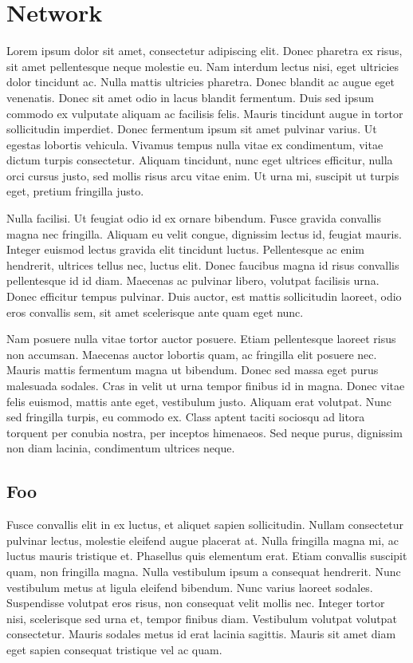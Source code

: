 \chapter{Network}

Lorem ipsum dolor sit amet, consectetur adipiscing
elit. Donec pharetra ex risus, sit amet pellentesque
neque molestie eu. Nam interdum lectus nisi, eget
ultricies dolor tincidunt ac. Nulla mattis ultricies
pharetra. Donec blandit ac augue eget venenatis.
Donec sit amet odio in lacus blandit fermentum. Duis
sed ipsum commodo ex vulputate aliquam ac facilisis
felis. Mauris tincidunt augue in tortor sollicitudin
imperdiet. Donec fermentum ipsum sit amet pulvinar
varius. Ut egestas lobortis vehicula. Vivamus tempus
nulla vitae ex condimentum, vitae dictum turpis
consectetur. Aliquam tincidunt, nunc eget ultrices
efficitur, nulla orci cursus justo, sed mollis risus
arcu vitae enim. Ut urna mi, suscipit ut turpis
eget, pretium fringilla justo.

Nulla facilisi. Ut feugiat odio id ex ornare
bibendum. Fusce gravida convallis magna nec
fringilla. Aliquam eu velit congue, dignissim lectus
id, feugiat mauris. Integer euismod lectus gravida
elit tincidunt luctus. Pellentesque ac enim
hendrerit, ultrices tellus nec, luctus elit. Donec
faucibus magna id risus convallis pellentesque id id
diam. Maecenas ac pulvinar libero, volutpat
facilisis urna. Donec efficitur tempus pulvinar.
Duis auctor, est mattis sollicitudin laoreet, odio
eros convallis sem, sit amet scelerisque ante quam
eget nunc.

Nam posuere nulla vitae tortor auctor posuere. Etiam
pellentesque laoreet risus non accumsan. Maecenas
auctor lobortis quam, ac fringilla elit posuere nec.
Mauris mattis fermentum magna ut bibendum. Donec sed
massa eget purus malesuada sodales. Cras in velit ut
urna tempor finibus id in magna. Donec vitae felis
euismod, mattis ante eget, vestibulum justo. Aliquam
erat volutpat. Nunc sed fringilla turpis, eu commodo
ex. Class aptent taciti sociosqu ad litora torquent
per conubia nostra, per inceptos himenaeos. Sed
neque purus, dignissim non diam lacinia, condimentum
ultrices neque.

\section{Foo}

Fusce convallis elit in ex luctus, et aliquet sapien
sollicitudin. Nullam consectetur pulvinar lectus,
molestie eleifend augue placerat at. Nulla fringilla
magna mi, ac luctus mauris tristique et. Phasellus
quis elementum erat. Etiam convallis suscipit quam,
non fringilla magna. Nulla vestibulum ipsum a
consequat hendrerit. Nunc vestibulum metus at ligula
eleifend bibendum. Nunc varius laoreet sodales.
Suspendisse volutpat eros risus, non consequat velit
mollis nec. Integer tortor nisi, scelerisque sed
urna et, tempor finibus diam. Vestibulum volutpat
volutpat consectetur. Mauris sodales metus id erat
lacinia sagittis. Mauris sit amet diam eget sapien
consequat tristique vel ac quam.

